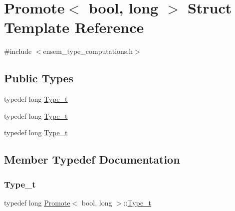\hypertarget{structPromote_3_01bool_00_01long_01_4}{}\section{Promote$<$ bool, long $>$ Struct Template Reference}
\label{structPromote_3_01bool_00_01long_01_4}


{\ttfamily \#include $<$ensem\+\_\+type\+\_\+computations.\+h$>$}

\subsection*{Public Types}
\begin{DoxyCompactItemize}
\item 
typedef long \mbox{\hyperlink{structPromote_3_01bool_00_01long_01_4_acd7afc9445455e248d40955c9a61e0d3}{Type\+\_\+t}}
\item 
typedef long \mbox{\hyperlink{structPromote_3_01bool_00_01long_01_4_acd7afc9445455e248d40955c9a61e0d3}{Type\+\_\+t}}
\item 
typedef long \mbox{\hyperlink{structPromote_3_01bool_00_01long_01_4_acd7afc9445455e248d40955c9a61e0d3}{Type\+\_\+t}}
\end{DoxyCompactItemize}


\subsection{Member Typedef Documentation}
\mbox{\label{structPromote_3_01bool_00_01long_01_4_acd7afc9445455e248d40955c9a61e0d3}} 
\subsubsection{\texorpdfstring{Type\_t}{Type\_t}\hspace{0.1cm}{\footnotesize\ttfamily [1/3]}}
{\footnotesize\ttfamily typedef long \mbox{\hyperlink{structPromote}{Promote}}$<$ bool, long $>$\+::\mbox{\hyperlink{structPromote_3_01bool_00_01long_01_4_acd7afc9445455e248d40955c9a61e0d3}{Type\+\_\+t}}}

\mbox{\label{structPromote_3_01bool_00_01long_01_4_acd7afc9445455e248d40955c9a61e0d3}} 
